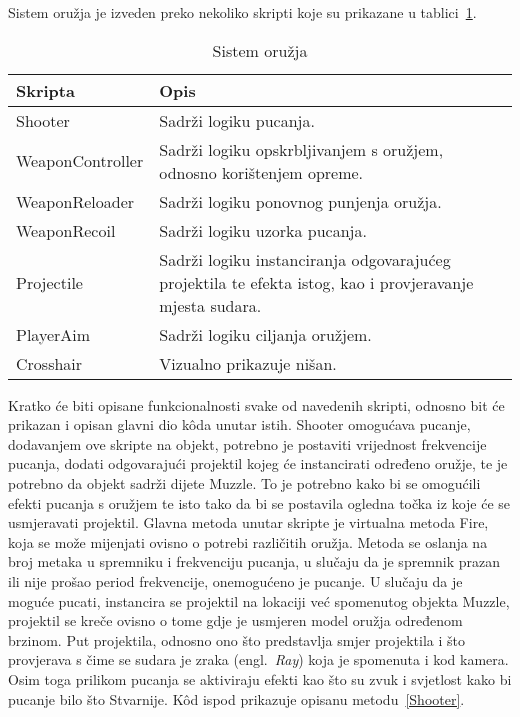 Sistem oružja je izveden preko nekoliko skripti koje su prikazane u tablici~\ref{fig:WeaponSystemTable}.
\begin{table}
\begin{tabularx}{0.9\textwidth}{lX}
\hline
Skripta&Opis \\
\hline
Shooter&Sadrži logiku pucanja. \\
WeaponController&Sadrži logiku opskrbljivanjem s oružjem, odnosno korištenjem opreme.\\
WeaponReloader&Sadrži logiku ponovnog punjenja oružja.\\
WeaponRecoil&Sadrži logiku uzorka pucanja. \\
Projectile&Sadrži logiku instanciranja odgovarajućeg projektila te efekta istog, kao i provjeravanje mjesta sudara. \\
PlayerAim&Sadrži logiku ciljanja oružjem. \\
Crosshair&Vizualno prikazuje nišan. \\
\hline
\end{tabularx}
\caption{Sistem oružja}\label{fig:WeaponSystemTable}
\end{table}
Kratko će biti opisane funkcionalnosti svake od navedenih skripti, odnosno bit će prikazan i opisan glavni dio k\^oda unutar istih. 
Shooter omogućava pucanje, dodavanjem ove skripte na objekt, potrebno je postaviti vrijednost frekvencije pucanja, dodati odgovarajući projektil kojeg će instancirati određeno oružje, te je potrebno da objekt sadrži dijete Muzzle. To je potrebno kako bi se omogućili efekti pucanja s oružjem te isto tako da bi se postavila ogledna točka iz koje će se usmjeravati projektil. Glavna metoda unutar skripte je virtualna metoda Fire, koja se može mijenjati ovisno o potrebi različitih oružja. Metoda se oslanja na broj metaka u spremniku i frekvenciju pucanja, u slučaju da je spremnik prazan ili nije prošao period frekvencije, onemogućeno je pucanje. U slučaju da je moguće pucati, instancira se projektil na lokaciji već spomenutog objekta Muzzle, projektil se kreče ovisno o tome gdje je usmjeren model oružja određenom brzinom. Put projektila, odnosno ono što predstavlja smjer projektila i što provjerava s čime se sudara je zraka (engl.~\textit{Ray}) koja je spomenuta i kod kamera. Osim toga prilikom pucanja se aktiviraju efekti kao što su zvuk i svjetlost kako bi pucanje bilo što Stvarnije. K\^od ispod prikazuje opisanu metodu~\ref{Shooter}.
